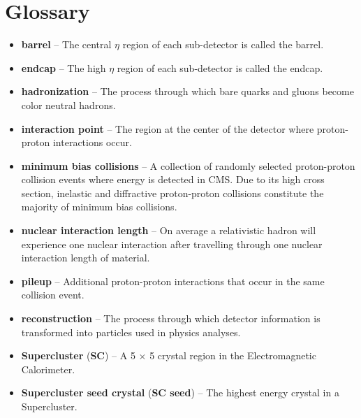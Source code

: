 \section{Glossary}
\label{jargonapp}
\begin{itemize}

	\item \textbf{barrel} -- The central $\eta$ region of each sub-detector is 
		called the barrel.
	\item \textbf{endcap} -- The high $\eta$ region of each sub-detector is 
		called the endcap.
	\item \textbf{hadronization} -- The process through which bare quarks and 
		gluons become color neutral hadrons.
	\item \textbf{interaction point} -- The region at the center of the detector 
		where proton-proton interactions occur.
	\item \textbf{minimum bias collisions} -- A collection of randomly selected 
		proton-proton collision events where energy is detected in CMS.  Due to 
		its high cross section, inelastic and diffractive proton-proton collisions 
		constitute the majority of minimum bias collisions.
	\item \textbf{nuclear interaction length} -- On average a relativistic hadron 
		will experience one nuclear interaction after travelling through one 
		nuclear interaction length of material.
	\item \textbf{pileup} -- Additional proton-proton interactions that occur 
		in the same collision event.
	\item \textbf{reconstruction} -- The process through which detector information 
		is transformed into particles used in physics analyses.
	\item \textbf{Supercluster} (\textbf{SC}) -- A 5 $\times$ 5 crystal region 
		in the Electromagnetic Calorimeter.
	\item \textbf{Supercluster seed crystal} (\textbf{SC seed}) -- The highest 
		energy crystal in a Supercluster.
\end{itemize}

